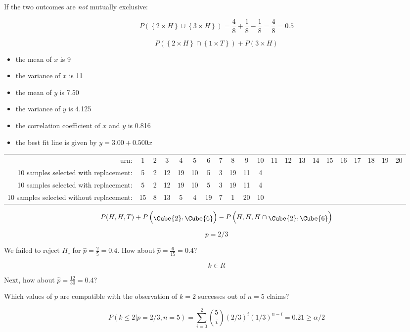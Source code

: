\documentclass{article}
\begin{document}
If the two outcomes are \emph{not} mutually exclusive:

\[
P\left(\left\{2\times{H}\right\} \cup \left\{3\times{H}\right\}\right)
= \frac{4}{8} + \frac{1}{8} - \frac{1}{8} = \frac{4}{8} = 0.5
\]

\[
P\left(\left\{2\times{H}\right\} \cap \left\{1\times{T}\right\}\right) +
P\left(3 \times{H}\right)
\]

\begin{itemize}
\item the mean of $x$ is 9
\item the variance of $x$ is 11
\item the mean of $y$ is 7.50
\item the variance of $y$ is 4.125
\item the correlation coefficient of $x$ and $y$ is 0.816
\item the best fit line is given by $y = 3.00 + 0.500 x$
\end{itemize}

\begin{tabular}{r|cccccccccccccccccccc}
  urn: & 1 & 2 & 3 & 4 & 5 & 6 & 7 & 8 & 9 & 10 &
  11 & 12 & 13 & 14 & 15 & 16 & 17 & 18 & 19 & 20 \\
  10 samples selected with replacement: &
  5 & 2 & 12 & 19 & 10 & 5 & 3 & 19 & 11 & 4
  & & & & & & & & & & \\
  10 samples selected with replacement: &
  $\boxed{5}$ & 2 & 12 & $\boxed{19}$ & 10 & $\boxed{5}$ & 3 & $\boxed{19}$ & 11 & 4
  & & & & & & & & & & \\
  10 samples selected without replacement: &
  15 & 8 & 13 & 5 & 4 & 19 & 7 & 1 & 20 & 10
  & & & & & & & & & & 
\end{tabular}

\[
P(H,H,T) +
P\left(\raisebox{-2pt}{\Cube{2}},\raisebox{-2pt}{\Cube{6}}\right) -
P\left(H,H,H \cap \raisebox{-2pt}{\Cube{2}},\raisebox{-2pt}{\Cube{6}}\right)
\]

\[
p = 2/3
\]

We failed to reject $H_\circ$ for $\hat{p}=\frac{2}{5}=0.4$. How about
$\hat{p}=\frac{6}{15}=0.4$?

\[
k \in R
\]

Next, how about $\hat{p}=\frac{12}{30}=0.4$?

Which values of $p$ are compatible with the observation of $k=2$
successes out of $n=5$ claims?

\[
P({k}\leq{2}|p=2/3,n=5) =
\sum\limits_{i=0}^{2}\binom{5}{i}(2/3)^i(1/3)^{n-i} = 0.21 \geq \alpha/2
\]
\end{document}
